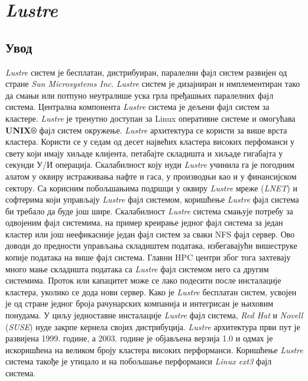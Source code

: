 \chapter{ \textit{Lustre} }
\section{Увод}

\textit{Lustre}   систем је бесплатан, дистрибуиран, паралелни фајл систем развијен од стране \textit{Sun Microsystems Inc}.  \textit{Lustre}  систем је дизајниран и имплементиран тако да смањи  или потпуно неутралише уска грла пређашњих паралелних фајл система. Централна компонента   \textit{Lustre}  система је дељени фајл систем за кластере.  \textit{Lustre}  је тренутно доступан за Linux оперативне системе и омогућава \textbf{UNIX®} фајл систем окружење.  \textit{Lustre}  архитектура се користи за више врста кластера. Користи се у седам од десет највећих кластера високих перфоманси у свету који имају хиљаде клијента, петабајте складишта и хиљаде  гигабајта у секунди У/И операција. Скалабилност коју нуди   \textit{Lustre}  учинила га је погодним алатом у оквиру истраживања нафте и гаса, у производњи као и у финансијском сектору. Са корисним побољшањима подршци у оквиру  \textit{Lustre}  мреже (\textit{LNET}) и софтерима који управљају  \textit{Lustre}  фајл системом, коришћење  \textit{Lustre}  фајл система би требало да буде још шире. Скалабилност   \textit{Lustre}  система смањује потребу за одвојеним фајл системима, на пример креирање једног фајл система за један кластер или још неефикасније један фајл систем за сваки \gls{NFS} фајл сервер. Ово доводи до предности управљања складиштем података, избегавајући вишеструке копије података на више фајл система. Главни  \gls{HPC} центри због тога захтевају много мање складишта података са   \textit{Lustre}  фајл системом него са другим системима. Проток или капацитет може се лако подесити после инсталације кластера, уколико се дода нови сервер. Како је   \textit{Lustre}  бесплатан систем, усвојен је од стране једног броја рачунарских компанија и интегрисан је њиховим понудама. У циљу једноставне инсталације   \textit{Lustre}  фајл система, \textit{Red Hat} и \textit{Novell} (\textit{SUSE}) нуде закрпе кернела својих дистрибуција.  \textit{Lustre}  архитектура први пут је развијена 1999. године, а 2003. године је објављена верзија 1.0 и одмах је искоришћена на великом броју кластера високих перформанси. Коришћење   \textit{Lustre}  система такође је утицало и на побољшање перформанси \textit{Linux ext3} фајл система.


